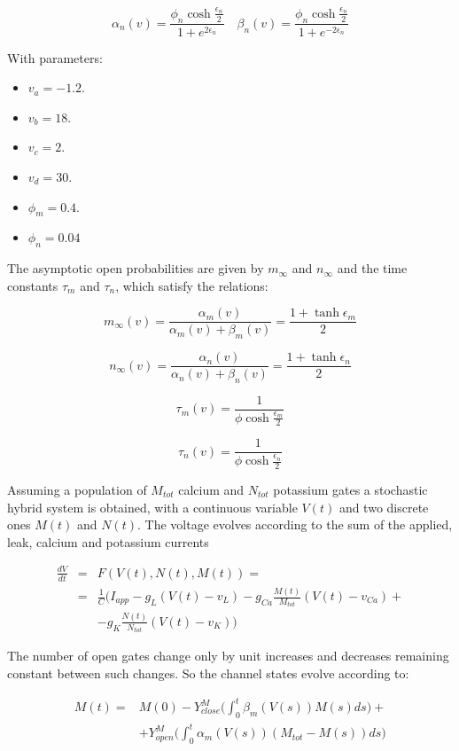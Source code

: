 $$\alpha_n(v) = \frac{\phi_n\cosh\frac{\epsilon_n}{2}}{1+e^{2\epsilon_n}}\quad\beta_n(v) = \frac{\phi_n\cosh\frac{\epsilon_n}{2}}{1+e^{-2\epsilon_n}}$$

With parameters:

\begin{multicols}{3}
	\begin{itemize}
		\item $v_a = -1.2$.
		\item $v_b = 18$.
		\item $v_c = 2$.
		\item $v_d = 30$.
		\item $\phi_m = 0.4$.
		\item $\phi_n = 0.04$
	\end{itemize}
\end{multicols}

The asymptotic open probabilities are given by $m_\infty$ and $n_\infty$ and the time constants $\tau_m$ and $\tau_n$, which satisfy the relations:

$$m_\infty(v) = \frac{\alpha_m(v)}{\alpha_m(v) + \beta_m(v)} = \frac{1+\tanh\epsilon_m}{2}$$

$$n_\infty(v) = \frac{\alpha_n(v)}{\alpha_n(v) + \beta_n(v)} = \frac{1+\tanh\epsilon_n}{2}$$

$$\tau_m(v) = \frac{1}{\phi\cosh\frac{\epsilon_m}{2}}$$

$$\tau_n(v) = \frac{1}{\phi\cosh\frac{\epsilon_n}{2}}$$

Assuming a population of $M_{tot}$ calcium and $N_{tot}$ potassium gates a stochastic hybrid system is obtained, with a continuous variable $V(t)$ and two discrete ones $M(t)$ and $N(t)$.
The voltage evolves according to the sum of the applied, leak, calcium and potassium currents

\begin{align*}
	\frac{dV}{dt} &=&  F(V(t), N(t), M(t)) = \\
								&=& \frac{1}{C}\biggl(I_{app} - g_L(V(t)-v_L)-g_{Ca}\frac{M(t)}{M_{tot}}(V(t)-v_{Ca}) +\\
								& &- g_K\frac{N(t)}{N_{tot}}(V(t)-v_K)\biggr)
\end{align*}

The number of open gates change only by unit increases and decreases remaining constant between such changes.
So the channel states evolve according to:

\begin{align*}
	M(t) =&M(0) - Y_{close}^M\biggl(\int_0^t\beta_m(V(s))M(s)ds\biggr)+\\
				&+Y_{open}^M\biggl(\int_0^t\alpha_m(V(s))(M_{tot}-M(s))ds\biggr)
\end{align*}

